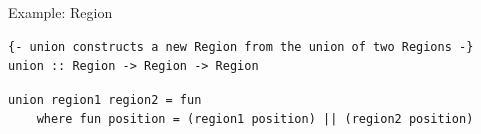 \documentclass[8pt,aspectratio=169]{beamer}
\begin{document}
\begin{frame}[fragile]{Example: Region}
\vspace{3mm}

\setlength\partopsep{-\topsep}
\addtolength\partopsep{-\parskip}
\addtolength\partopsep{0.1cm}

\pause
\begin{verbatim}
{- union constructs a new Region from the union of two Regions -}
union :: Region -> Region -> Region
\end{verbatim}

\pause
\begin{verbatim}
union region1 region2 = fun
    where fun position = (region1 position) || (region2 position)
\end{verbatim}

\setlength\partopsep{2pt}

\end{frame}

\end{document}
